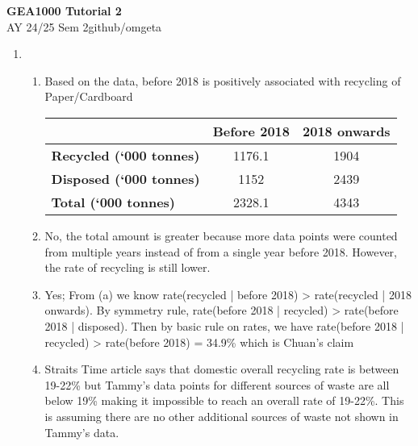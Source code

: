 \documentclass[12pt, a4paper]{article}
\newcommand{\mytitle}{GEA1000 Tutorial 2}
\newcommand{\myauthor}{github/omgeta}
\newcommand{\mydate}{AY 24/25 Sem 2}
\begin{document}
\raggedright
\footnotesize
\begin{center}
{\normalsize{\textbf{\mytitle}}} \\
{\footnotesize{\mydate\hspace{2pt}\textemdash\hspace{2pt}\myauthor}}
\end{center}
\begin{enumerate}[Q\arabic*.]
  \item 
    \begin{enumerate}[(\alph*.)]
      \item Based on the data, before 2018 is positively associated with recycling of Paper/Cardboard
        \begin{table}[h]
          \centering
          \begin{tabular}{|l|c|c|}
              \hline
              & \textbf{Before 2018} & \textbf{2018 onwards} \\
              \hline
              \textbf{Recycled (‘000 tonnes)} & 1176.1 & 1904 \\
              \hline
              \textbf{Disposed (‘000 tonnes)} & 1152 & 2439\\
              \hline
              \textbf{Total (‘000 tonnes)} & 2328.1 & 4343\\
              \hline
          \end{tabular}
      \end{table}

    \item No, the total amount is greater because more data points were counted from multiple years instead of from a single year before 2018. However, the rate of recycling is still lower.

    \item Yes; From (a) we know rate(recycled | before 2018) > rate(recycled | 2018 onwards). By symmetry rule, rate(before 2018 | recycled) > rate(before 2018 | disposed). Then by basic rule on rates, we have rate(before 2018 | recycled) > rate(before 2018) = 34.9\% which is Chuan's claim 

    \item Straits Time article says that domestic overall recycling rate is between 19-22\% but Tammy's data points for different sources of waste are all below 19\% making it impossible to reach an overall rate of 19-22\%. This is assuming there are no other additional sources of waste not shown in Tammy's data.


\end{enumerate}
\end{enumerate}
\end{document}
